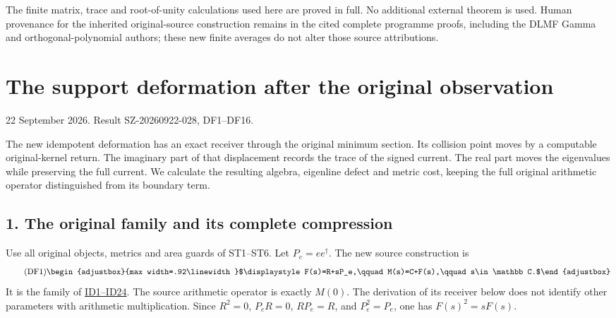 \documentclass[10pt]{article}
\begin{document}
The finite matrix, trace and root-of-unity calculations used here are proved in full. No additional external theorem is used. Human provenance for the inherited original-source construction remains in the cited complete programme proofs, including the DLMF Gamma and orthogonal-polynomial authors; these new finite averages do not alter those source attributions.

\clearpage
\section{The support deformation after the original observation}\label{the-support-deformation-after-the-original-observation}

22 September 2026. Result SZ-20260922-028, DF1--DF16.

The new idempotent deformation has an exact receiver through the original minimum section. Its collision point moves by a computable original-kernel return. The imaginary part of that displacement records the trace of the signed current. The real part moves the eigenvalues while preserving the full current. We calculate the resulting algebra, eigenline defect and metric cost, keeping the full original arithmetic operator distinguished from its boundary term.

\subsection{1. The original family and its complete compression}\label{the-original-family-and-its-complete-compression}

Use all original objects, metrics and area guards of ST1--ST6. Let \(P_e=ee^\dagger\). The new source construction is 
\begin{equation*}
\tag{DF1}
\begin{adjustbox}{max width=.92\linewidth}$\displaystyle F(s)=R+sP_e,\qquad M(s)=C+F(s),\qquad s\in\mathbb C.$\end{adjustbox}
\end{equation*}
 It is the family of \href{https://github.com/KokunoYumeto/zeta-function-research-reader/blob/6af54ea3c8ef99127af327f3103e086c68d482c2/workbenches/splitzero-tandem/branches/identity-absorber-square/IDEMPOTENT_DEFORMATION.md}{ID1--ID24}. The source arithmetic operator is exactly \(M(0)\). The derivation of its receiver below does not identify other parameters with arithmetic multiplication. Since \(R^2=0\), \(P_eR=0\), \(RP_e=R\), and \(P_e^2=P_e\), one has \(F(s)^2=sF(s)\).
\end{document}
